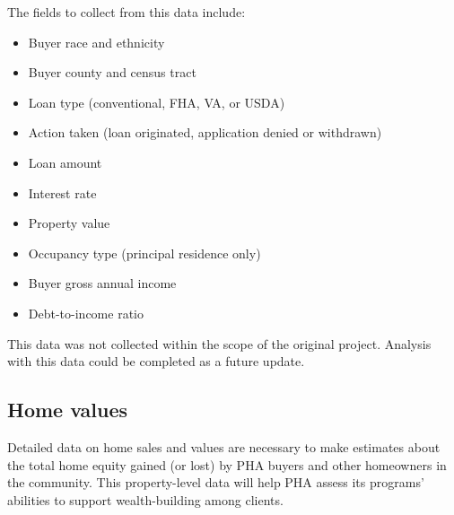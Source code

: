 \documentclass[
  letterpaper,
  DIV=11,
  numbers=noendperiod]{scrartcl}
\providecommand{\tightlist}{%
  \setlength{\itemsep}{0pt}\setlength{\parskip}{0pt}}\usepackage{longtable,booktabs,array}
\begin{document}
The fields to collect from this data include:

\begin{itemize}
\tightlist
\item
  Buyer race and ethnicity
\item
  Buyer county and census tract
\item
  Loan type (conventional, FHA, VA, or USDA)
\item
  Action taken (loan originated, application denied or withdrawn)
\item
  Loan amount
\item
  Interest rate
\item
  Property value
\item
  Occupancy type (principal residence only)
\item
  Buyer gross annual income
\item
  Debt-to-income ratio
\end{itemize}

\begin{tcolorbox}[enhanced jigsaw, coltitle=black, titlerule=0mm, breakable, colbacktitle=quarto-callout-caution-color!10!white, opacityback=0, leftrule=.75mm, opacitybacktitle=0.6, rightrule=.15mm, title=\textcolor{quarto-callout-caution-color}{\faFire}\hspace{0.5em}{Future work}, arc=.35mm, colback=white, bottomtitle=1mm, toptitle=1mm, colframe=quarto-callout-caution-color-frame, bottomrule=.15mm, toprule=.15mm, left=2mm]

This data was not collected within the scope of the original project.
Analysis with this data could be completed as a future update.

\end{tcolorbox}

\hypertarget{home-values}{%
\subsection{Home values}\label{home-values}}

\begin{tcolorbox}[enhanced jigsaw, coltitle=black, titlerule=0mm, breakable, colbacktitle=quarto-callout-tip-color!10!white, opacityback=0, leftrule=.75mm, opacitybacktitle=0.6, rightrule=.15mm, title=\textcolor{quarto-callout-tip-color}{\faLightbulb}\hspace{0.5em}{Why this is needed}, arc=.35mm, colback=white, bottomtitle=1mm, toptitle=1mm, colframe=quarto-callout-tip-color-frame, bottomrule=.15mm, toprule=.15mm, left=2mm]

Detailed data on home sales and values are necessary to make estimates
about the total home equity gained (or lost) by PHA buyers and other
homeowners in the community. This property-level data will help PHA
assess its programs' abilities to support wealth-building among clients.

\end{tcolorbox}
\end{document}
